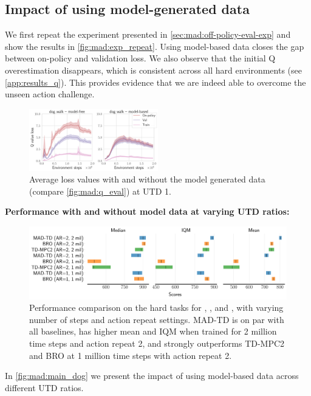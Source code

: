 \subsection{Impact of using model-generated data}

We first repeat the experiment presented in \autoref{sec:mad:off-policy-eval-exp} and show the results in \autoref{fig:mad:exp_repeat}.
Using model-based data closes the gap between on-policy and validation loss.
We also observe that the initial Q overestimation disappears, which is consistent across all hard environments (see \autoref{app:results_q}).
This provides evidence that we are indeed able to overcome the unseen action challenge.

\begin{figure}
    \centering
    \includegraphics[width=0.5\textwidth]{figures/mad-td/critic_loss_dog_walk_model_based_separate.pdf}
    \caption{Average loss values with and without the model generated data (compare \autoref{fig:mad:q_eval}) at UTD 1.}
    \label{fig:mad:exp_repeat}    
\end{figure}
\textbf{Performance with and without model data at varying UTD ratios:}~~~
\begin{figure}[b]
    \centering
    \includegraphics[width=1.\linewidth]{figures/mad-td/hard_rliable_comp.pdf}
    \caption{Performance comparison on the hard tasks for , , and , with varying number of steps and action repeat settings. MAD-TD is on par with all baselines, has higher mean and IQM when trained for 2 million time steps and action repeat 2, and strongly outperforms TD-MPC2 and BRO at 1 million time steps with action repeat 2.}
    \label{fig:mad:comp_baseline}
\end{figure}
In \autoref{fig:mad:main_dog} we present the impact of using model-based data across different UTD ratios.
